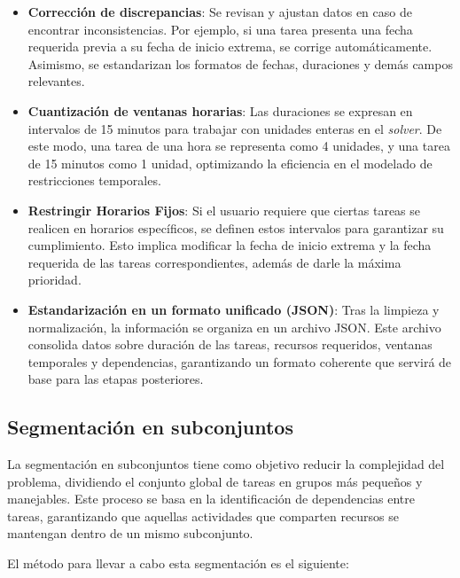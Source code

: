 \documentclass{article}
\begin{document}
\begin{itemize}
    \item \textbf{Corrección de discrepancias}: Se revisan y ajustan datos en caso de encontrar inconsistencias. Por ejemplo, si una tarea presenta una fecha requerida previa a su fecha de inicio extrema, se corrige automáticamente. Asimismo, se estandarizan los formatos de fechas, duraciones y demás campos relevantes.

    \item \textbf{Cuantización de ventanas horarias}: Las duraciones se expresan en intervalos de 15 minutos para trabajar con unidades enteras en el \textit{solver}. De este modo, una tarea de una hora se representa como 4 unidades, y una tarea de 15 minutos como 1 unidad, optimizando la eficiencia en el modelado de restricciones temporales.
    
    \item \textbf{Restringir Horarios Fijos}: Si el usuario requiere que ciertas tareas se realicen en horarios específicos, se definen estos intervalos para garantizar su cumplimiento. Esto implica modificar la fecha de inicio extrema y la fecha requerida de las tareas correspondientes, además de darle la máxima prioridad.

    \item \textbf{Estandarización en un formato unificado (JSON)}: Tras la limpieza y normalización, la información se organiza en un archivo JSON. Este archivo consolida datos sobre duración de las tareas, recursos requeridos, ventanas temporales y dependencias, garantizando un formato coherente que servirá de base para las etapas posteriores.

\end{itemize}



\subsection{Segmentación en subconjuntos}

La segmentación en subconjuntos tiene como objetivo reducir la complejidad del problema, dividiendo el conjunto global de tareas en grupos más pequeños y manejables. Este proceso se basa en la identificación de dependencias entre tareas, garantizando que aquellas actividades que comparten recursos se mantengan dentro de un mismo subconjunto.

El método para llevar a cabo esta segmentación es el siguiente:
\end{document}
